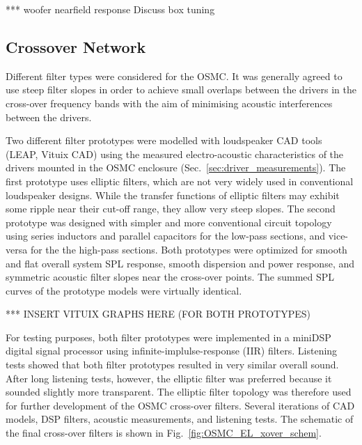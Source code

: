 \documentclass[12pt,a4paper]{article}
\providecommand{\figr}[1]{Fig.~\ref{fig:#1}}
\providecommand{\sectn}[1]{Sec.~\ref{sec:#1}}
\begin{document}
*** woofer nearfield response
Discuss box tuning





\subsection{Crossover Network}

Different filter types were considered for the OSMC. It was generally agreed to use steep filter slopes in order to achieve small overlaps between the drivers in the cross-over frequency bands with the aim of minimising acoustic interferences between the drivers.

Two different filter prototypes\cite{osmc_p685} were modelled with loudspeaker CAD tools (LEAP, Vituix CAD) using the measured electro-acoustic characteristics of the drivers mounted in the OSMC enclosure (\sectn{driver_measurements}). The first prototype uses elliptic filters, which are not very widely used in conventional loudspeaker designs. While the transfer functions of elliptic filters may exhibit some ripple near their cut-off range, they allow very steep slopes. The second prototype was designed with simpler and more conventional circuit topology using series inductors and parallel capacitors for the low-pass sections, and vice-versa for the the high-pass sections. Both prototypes were optimized for smooth and flat overall system SPL response, smooth dispersion and power response, and symmetric acoustic filter slopes near the cross-over points. The summed SPL curves of the prototype models were virtually identical.

*** INSERT VITUIX GRAPHS HERE (FOR BOTH PROTOTYPES)

For testing purposes, both filter prototypes were implemented in a miniDSP digital signal processor using infinite-implulse-response (IIR) filters. Listening tests showed that both filter prototypes resulted in very similar overall sound. After long listening tests, however, the elliptic filter was preferred because it sounded slightly more transparent\cite{osmc_p708}. The elliptic filter topology was therefore used for further development of the OSMC cross-over filters. Several iterations of CAD models, DSP filters, acoustic measurements, and listening tests. The schematic of the final cross-over filters is shown in \figr{OSMC_EL_xover_schem}.
\end{document}
